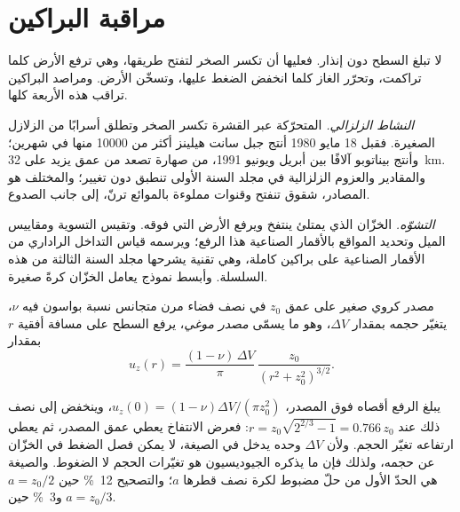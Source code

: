 \section{مراقبة البراكين}

لا تبلغ  السطح دون إنذار. فعليها أن تكسر الصخر لتفتح
طريقها، وهي ترفع الأرض كلما تراكمت، وتحرّر الغاز كلما انخفض الضغط
عليها، وتسخّن الأرض. ومراصد البراكين تراقب هذه الأربعة كلها.

\emph{النشاط الزلزالي.}  المتحرّكة عبر القشرة تكسر الصخر وتطلق أسرابًا
من الزلازل الصغيرة. فقبل 18 مايو 1980 أنتج جبل سانت هيلينز أكثر من
\num{10000} منها في شهرين؛ وأنتج بيناتوبو آلافًا بين أبريل
ويونيو 1991، من صهارة تصعد من عمق يزيد على \qty{32}{km}. والمقادير
والعزوم الزلزالية في مجلد السنة الأولى تنطبق دون تغيير؛ والمختلف هو
المصادر، شقوق تنفتح وقنوات مملوءة بالموائع ترنّ، إلى جانب الصدوع.

\emph{التشوّه.} الخزّان الذي يمتلئ ينتفخ ويرفع الأرض التي
فوقه. وتقيس التسوية ومقاييس الميل وتحديد المواقع بالأقمار الصناعية هذا الرفع؛ ويرسمه قياس التداخل الراداري من الأقمار الصناعية على
براكين كاملة، وهي تقنية يشرحها مجلد السنة الثالثة من هذه السلسلة. وأبسط
نموذج يعامل الخزّان كرةً صغيرة.

\begin{proposition}\label{prop:b2:eruptive-styles:mogi}
مصدر كروي صغير على عمق $z_0$ في نصف فضاء مرن متجانس
نسبة بواسون فيه $\nu$، يتغيّر حجمه بمقدار $\Delta V$، وهو ما يسمّى
\emph{مصدر موغي}، يرفع السطح على مسافة أفقية $r$
بمقدار
\[
u_z(r) = \frac{(1 - \nu)\,\Delta V}{\pi}\,\frac{z_0}{(r^2 + z_0^2)^{3/2}} .
\]
\end{proposition}
\admitted

يبلغ الرفع أقصاه فوق المصدر، $u_z(0) = (1 - \nu)\Delta V/(\pi z_0^2)$،
وينخفض إلى نصف ذلك عند $r = z_0\sqrt{2^{2/3} - 1} = 0.766\,z_0$: فعرض
الانتفاخ يعطي عمق المصدر، ثم يعطي ارتفاعه تغيّر
الحجم. ولأن $\Delta V$ وحده يدخل في الصيغة، لا يمكن فصل الضغط في الخزّان عن حجمه،
ولذلك فإن ما يذكره الجيوديسيون هو تغيّرات الحجم لا الضغوط.
والصيغة هي الحدّ الأول من حلّ مضبوط لكرة نصف قطرها
$a$؛ والتصحيح \qty{12}{\percent} حين $a = z_0/2$ و\qty{3}{\percent}
حين $a = z_0/3$.

